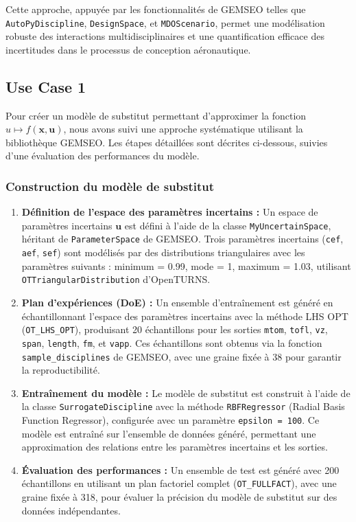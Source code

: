 \documentclass[a4paper, 11pt]{article}
\begin{document}
Cette approche, appuyée par les fonctionnalités de GEMSEO telles que \texttt{AutoPyDiscipline}, \texttt{DesignSpace}, et \texttt{MDOScenario}, permet une modélisation robuste des interactions multidisciplinaires et une quantification efficace des incertitudes dans le processus de conception aéronautique.


\subsection{Use Case 1}


Pour créer un modèle de substitut permettant d’approximer la fonction \( u \mapsto f(\mathbf{x}, \mathbf{u}) \), nous avons suivi une approche systématique utilisant la bibliothèque GEMSEO. Les étapes détaillées sont décrites ci-dessous, suivies d’une évaluation des performances du modèle.

\subsubsection{Construction du modèle de substitut}

\begin{enumerate}
    \item \textbf{Définition de l’espace des paramètres incertains :} Un espace de paramètres incertains \( \mathbf{u} \) est défini à l’aide de la classe \texttt{MyUncertainSpace}, héritant de \texttt{ParameterSpace} de GEMSEO. Trois paramètres incertains (\texttt{cef}, \texttt{aef}, \texttt{sef}) sont modélisés par des distributions triangulaires avec les paramètres suivants : minimum = 0.99, mode = 1, maximum = 1.03, utilisant \texttt{OTTriangularDistribution} d’OpenTURNS.

    \item \textbf{Plan d’expériences (DoE) :} Un ensemble d’entraînement est généré en échantillonnant l’espace des paramètres incertains avec la méthode LHS OPT (\texttt{OT\_LHS\_OPT}), produisant 20 échantillons pour les sorties \texttt{mtom}, \texttt{tofl}, \texttt{vz}, \texttt{span}, \texttt{length}, \texttt{fm}, et \texttt{vapp}. Ces échantillons sont obtenus via la fonction \texttt{sample\_disciplines} de GEMSEO, avec une graine fixée à 38 pour garantir la reproductibilité.
    

    \item \textbf{Entraînement du modèle :} Le modèle de substitut est construit à l’aide de la classe \texttt{SurrogateDiscipline} avec la méthode \texttt{RBFRegressor} (Radial Basis Function Regressor), configurée avec un paramètre \texttt{epsilon = 100}. Ce modèle est entraîné sur l’ensemble de données généré, permettant une approximation des relations entre les paramètres incertains et les sorties.

    \item \textbf{Évaluation des performances :} Un ensemble de test est généré avec 200 échantillons en utilisant un plan factoriel complet (\texttt{OT\_FULLFACT}), avec une graine fixée à 318, pour évaluer la précision du modèle de substitut sur des données indépendantes.
\end{enumerate}
\end{document}

